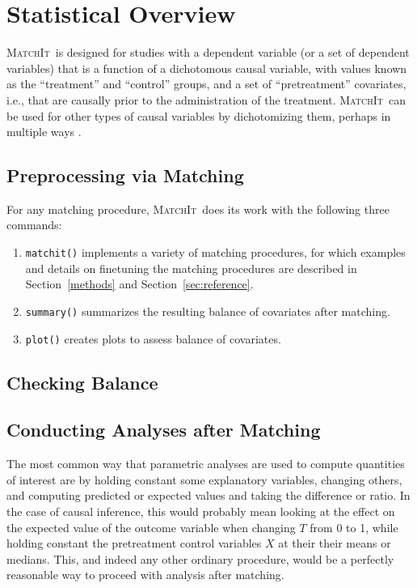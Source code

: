 \documentclass[oneside,letterpaper,titlepage]{article}
\newcommand{\MatchIt}{\textsc{MatchIt}}
\begin{document}

\section{Statistical Overview}

\MatchIt\ is designed for studies with a dependent variable (or a set
of dependent variables) that is a function of a dichotomous causal
variable, with values known as the ``treatment'' and ``control''
groups, and a set of ``pretreatment'' covariates, i.e., that are
causally prior to the administration of the treatment.  \MatchIt\ can
be used for other types of causal variables by dichotomizing them,
perhaps in multiple ways \citep[see also][]{ImaDyk04}.

\subsection{Preprocessing via Matching}

For any matching procedure, \MatchIt\ does its work with the following
three commands:

\begin{enumerate}
\item \texttt{matchit()} implements a variety of matching procedures,
  for which examples and details on finetuning the matching procedures
  are described in Section~\ref{methods} and
  Section~\ref{sec:reference}.
  
\item \texttt{summary()} summarizes the resulting balance of
  covariates after matching.
  
\item \texttt{plot()} creates plots to assess balance of covariates.
\end{enumerate}

\subsection{Checking Balance}

\subsection{Conducting Analyses after Matching}

The most common way that parametric analyses are used to compute
quantities of interest are by holding constant some explanatory
variables, changing others, and computing predicted or expected values
and taking the difference or ratio.  In the case of causal inference,
this would probably mean looking at the effect on the expected value
of the outcome variable when changing $T$ from 0 to 1, while holding
constant the pretreatment control variables $X$ at their their means
or medians.  This, and indeed any other ordinary procedure, would be a
perfectly reasonable way to proceed with analysis after matching.
\end{document}

